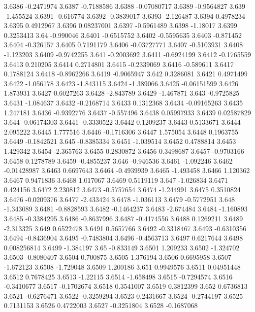 3.6386  -0.2471974
3.6387  -0.7188586
3.6388  -0.07080717
3.6389  -0.9564827
3.639  -1.455524
3.6391  -0.616774
3.6392  -0.3839017
3.6393  -2.126487
3.6394  0.4978234
3.6395  0.4912967
3.6396  0.08237001
3.6397  -0.5961489
3.6398  -1.18017
3.6399  0.3253413
3.64  -0.990046
3.6401  -0.6515752
3.6402  -0.5595635
3.6403  -0.871452
3.6404  -0.326157
3.6405  0.7191179
3.6406  -0.03727771
3.6407  -0.5103931
3.6408  -1.123203
3.6409  -0.9742255
3.641  -0.2003692
3.6411  -0.6924199
3.6412  -0.1765559
3.6413  0.210205
3.6414  0.2714801
3.6415  -0.2339069
3.6416  -0.589611
3.6417  0.1788124
3.6418  -0.8962266
3.6419  -0.9065947
3.642  0.3286081
3.6421  0.4971499
3.6422  -1.056178
3.6423  -1.843115
3.6424  -1.389066
3.6425  -0.06151599
3.6426  1.873931
3.6427  0.6027263
3.6428  -2.843789
3.6429  -1.467871
3.643  -0.9725825
3.6431  -1.084637
3.6432  -0.2168714
3.6433  0.1312368
3.6434  -0.09165263
3.6435  1.247181
3.6436  -0.9392776
3.6437  -0.557496
3.6438  0.05997933
3.6439  0.02587829
3.644  -0.06174303
3.6441  -0.3330522
3.6442  0.1209237
3.6443  0.5133671
3.6444  2.095222
3.6445  1.777516
3.6446  -0.1716306
3.6447  1.575054
3.6448  0.1963755
3.6449  -0.1842521
3.645  -0.8385334
3.6451  -1.039514
3.6452  0.4788814
3.6453  1.429342
3.6454  -2.365763
3.6455  0.2830872
3.6456  0.3498687
3.6457  -0.9703166
3.6458  0.1278789
3.6459  -0.4855237
3.646  -0.946536
3.6461  -1.092246
3.6462  -0.01428987
3.6463  0.6697643
3.6464  -0.4939939
3.6465  -1.493458
3.6466  1.120362
3.6467  0.9471836
3.6468  1.017067
3.6469  0.5119119
3.647  -1.026834
3.6471  0.424156
3.6472  2.230812
3.6473  -0.5757654
3.6474  -1.244991
3.6475  0.3510824
3.6476  -0.0209376
3.6477  -2.433424
3.6478  -1.036113
3.6479  -0.5772951
3.648  -1.343089
3.6481  -0.8828593
3.6482  -0.1464237
3.6483  -2.674484
3.6484  -1.160893
3.6485  -0.3384295
3.6486  -0.8637996
3.6487  -0.4174556
3.6488  0.1269211
3.6489  -2.313325
3.649  0.6522478
3.6491  0.5657766
3.6492  -0.3318467
3.6493  -0.6310356
3.6494  -0.8436904
3.6495  -0.7483804
3.6496  -0.4563713
3.6497  0.6217644
3.6498  0.008256814
3.6499  -1.384197
3.65  -0.833149
3.6501  1.209233
3.6502  -1.324702
3.6503  -0.8080407
3.6504  0.700875
3.6505  1.376194
3.6506  0.6695958
3.6507  -1.672123
3.6508  -1.729048
3.6509  1.200186
3.651  0.9949576
3.6511  0.04951448
3.6512  0.7678425
3.6513  -1.22115
3.6514  -1.658498
3.6515  -0.7294574
3.6516  -0.3410677
3.6517  -0.1702674
3.6518  0.3541007
3.6519  0.3812399
3.652  0.6736813
3.6521  -0.6276471
3.6522  -0.3259294
3.6523  0.2431667
3.6524  -0.2744197
3.6525  0.7131153
3.6526  0.4722003
3.6527  -0.3251804
3.6528  -0.1687068
